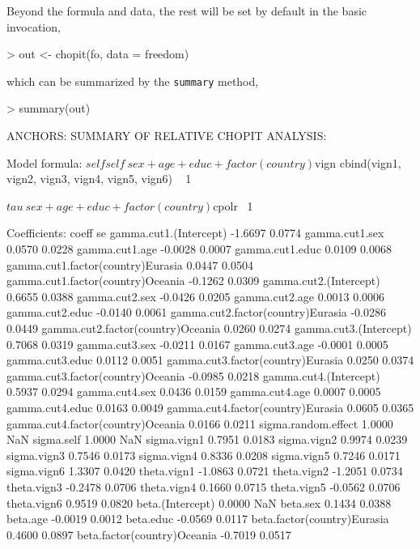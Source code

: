 \documentclass{amsart}
\newcommand{\code}[1]{{\texttt{#1}}}
\begin{document}
Beyond the formula and data, the rest will be set by default in the
basic invocation,
\begin{Schunk}
\begin{Sinput}
> out <- chopit(fo, data = freedom)
\end{Sinput}
\end{Schunk}
which can be summarized by the \code{summary} method,
\begin{Schunk}
\begin{Sinput}
> summary(out)
\end{Sinput}
\begin{Soutput}
ANCHORS: SUMMARY OF RELATIVE CHOPIT ANALYSIS:

Model formula:
$self
self ~ sex + age + educ + factor(country)

$vign
cbind(vign1, vign2, vign3, vign4, vign5, vign6) ~ 1

$tau
~sex + age + educ + factor(country)

$cpolr
~1


Coefficients:
                                    coeff     se
gamma.cut1.(Intercept)            -1.6697 0.0774
gamma.cut1.sex                     0.0570 0.0228
gamma.cut1.age                    -0.0028 0.0007
gamma.cut1.educ                    0.0109 0.0068
gamma.cut1.factor(country)Eurasia  0.0447 0.0504
gamma.cut1.factor(country)Oceania -0.1262 0.0309
gamma.cut2.(Intercept)             0.6655 0.0388
gamma.cut2.sex                    -0.0426 0.0205
gamma.cut2.age                     0.0013 0.0006
gamma.cut2.educ                   -0.0140 0.0061
gamma.cut2.factor(country)Eurasia -0.0286 0.0449
gamma.cut2.factor(country)Oceania  0.0260 0.0274
gamma.cut3.(Intercept)             0.7068 0.0319
gamma.cut3.sex                    -0.0211 0.0167
gamma.cut3.age                    -0.0001 0.0005
gamma.cut3.educ                    0.0112 0.0051
gamma.cut3.factor(country)Eurasia  0.0250 0.0374
gamma.cut3.factor(country)Oceania -0.0985 0.0218
gamma.cut4.(Intercept)             0.5937 0.0294
gamma.cut4.sex                     0.0436 0.0159
gamma.cut4.age                     0.0007 0.0005
gamma.cut4.educ                    0.0163 0.0049
gamma.cut4.factor(country)Eurasia  0.0605 0.0365
gamma.cut4.factor(country)Oceania  0.0166 0.0211
sigma.random.effect                1.0000    NaN
sigma.self                         1.0000    NaN
sigma.vign1                        0.7951 0.0183
sigma.vign2                        0.9974 0.0239
sigma.vign3                        0.7546 0.0173
sigma.vign4                        0.8336 0.0208
sigma.vign5                        0.7246 0.0171
sigma.vign6                        1.3307 0.0420
theta.vign1                       -1.0863 0.0721
theta.vign2                       -1.2051 0.0734
theta.vign3                       -0.2478 0.0706
theta.vign4                        0.1660 0.0715
theta.vign5                       -0.0562 0.0706
theta.vign6                        0.9519 0.0820
beta.(Intercept)                   0.0000    NaN
beta.sex                           0.1434 0.0388
beta.age                          -0.0019 0.0012
beta.educ                         -0.0569 0.0117
beta.factor(country)Eurasia        0.4600 0.0897
beta.factor(country)Oceania       -0.7019 0.0517


\end{Soutput}
\end{Schunk}
\end{document}
